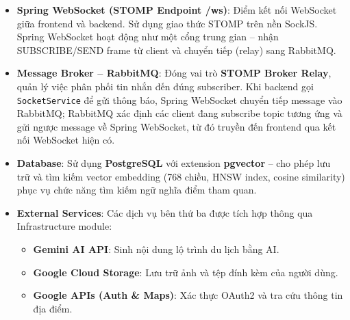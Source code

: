 \begin{itemize}
\begin{itemize}
              \item \textbf{Infrastructure Module} -- Module hạ tầng dùng chung, cung cấp các dịch vụ kỹ thuật nền tảng cho các Feature Module sử dụng:
                    \begin{itemize}
                        \item \textbf{AiService}: Giao tiếp với Gemini AI API để sinh gợi ý lộ trình du lịch từ ngữ cảnh và sở thích người dùng.
                        \item \textbf{CloudService}: Xử lý việc upload và xóa file lên Google Cloud Storage.
                        \item \textbf{MapService}: Tích hợp Google Maps API để tra cứu thông tin địa điểm và toạ độ.
                        \item \textbf{AuthService}: Xử lý xác thực OAuth2 với Google và quản lý JWT token.
                        \item \textbf{SocketService}: Cung cấp interface thống nhất để các Feature Module gửi tin nhắn WebSocket đến client thông qua \texttt{SimpMessagingTemplate}.
                    \end{itemize}
          \end{itemize}

    \item \textbf{Spring WebSocket (STOMP Endpoint /ws)}: Điểm kết nối WebSocket giữa frontend và backend. Sử dụng giao thức STOMP trên nền SockJS. Spring WebSocket hoạt động như một cổng trung gian -- nhận SUBSCRIBE/SEND frame từ client và chuyển tiếp (relay) sang RabbitMQ.

    \item \textbf{Message Broker -- RabbitMQ}: Đóng vai trò \textbf{STOMP Broker Relay}, quản lý việc phân phối tin nhắn đến đúng subscriber. Khi backend gọi \texttt{SocketService} để gửi thông báo, Spring WebSocket chuyển tiếp message vào RabbitMQ; RabbitMQ xác định các client đang subscribe topic tương ứng và gửi ngược message về Spring WebSocket, từ đó truyền đến frontend qua kết nối WebSocket hiện có.

    \item \textbf{Database}: Sử dụng \textbf{PostgreSQL} với extension \textbf{pgvector} -- cho phép lưu trữ và tìm kiếm vector embedding (768 chiều, HNSW index, cosine similarity) phục vụ chức năng tìm kiếm ngữ nghĩa điểm tham quan.

    \item \textbf{External Services}: Các dịch vụ bên thứ ba được tích hợp thông qua Infrastructure module:
          \begin{itemize}
              \item \textbf{Gemini AI API}: Sinh nội dung lộ trình du lịch bằng AI.
              \item \textbf{Google Cloud Storage}: Lưu trữ ảnh và tệp đính kèm của người dùng.
              \item \textbf{Google APIs (Auth \& Maps)}: Xác thực OAuth2 và tra cứu thông tin địa điểm.
          \end{itemize}


\end{itemize}

